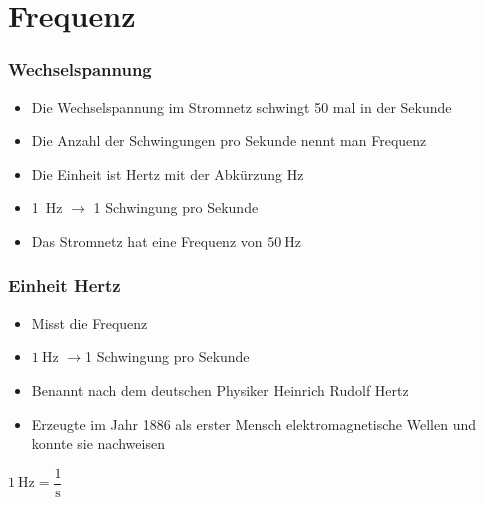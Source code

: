 
\section{Frequenz}
\label{section:frequenz}
\begin{frame}%

\frametitle{Wechselspannung}
\begin{itemize}
  \item Die Wechselspannung im Stromnetz schwingt 50 mal in der Sekunde
  \item Die Anzahl der Schwingungen pro Sekunde nennt man Frequenz
  \item Die Einheit ist Hertz mit der Abkürzung $\text{Hz}$
  \item \qty{1}{\hertz} $\rightarrow$ 1 Schwingung pro Sekunde
  \item Das Stromnetz hat eine Frequenz von $50\ \text{Hz}$
  \end{itemize}
\end{frame}

\begin{frame}
\frametitle{Einheit Hertz}
\begin{itemize}
  \item Misst die Frequenz
  \item $1\ \text{Hz}$ $\rightarrow$1 Schwingung pro Sekunde
  \item Benannt nach dem deutschen Physiker Heinrich Rudolf Hertz
  \item Erzeugte im Jahr 1886 als erster Mensch elektromagnetische Wellen und konnte sie nachweisen
  \end{itemize}
    \pause
    $1 \ \text{Hz} = \dfrac{1}{\text{s}}$



\end{frame}

\begin{frame}
\end{frame}

